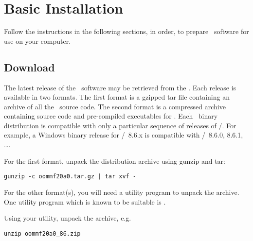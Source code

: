 \section{Basic Installation}\label{sec:install.basic}

Follow the instructions in the following sections, in order,
to prepare \OOMMF\ software for use on your computer.

\subsection{Download}\label{sec:install.download}

The latest release of the \OOMMF\ software may be retrieved from the
.  Each release is
available in two formats.  The first format is a gzipped tar file
containing an archive of all the \OOMMF\ source code.  The second format
is a  compressed archive containing source code and
pre-compiled executables for \Windows.  Each \Windows\ binary
distribution is compatible with only a particular sequence of releases
of \Tcl/\Tk.  For example, a Windows binary release for \Tcl/\Tk\ 8.6.x
is compatible with \Tcl/\Tk\ 8.6.0, 8.6.1, \ldots.

For the first format, unpack the distribution archive using gunzip and
tar:
\begin{verbatim}
gunzip -c oommf20a0.tar.gz | tar xvf -
\end{verbatim}

For the other format(s), you will need a utility program to unpack the
 archive.
One utility program which is known to be suitable is
.

Using your utility, unpack the  archive, e.g.
\begin{verbatim}
unzip oommf20a0_86.zip
\end{verbatim}

